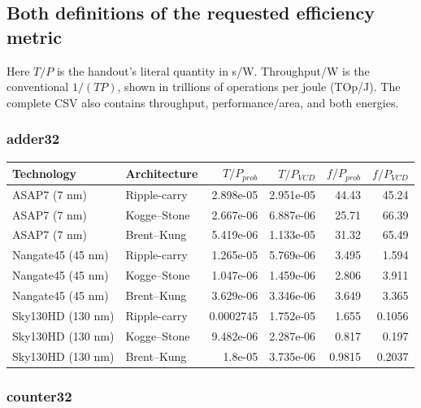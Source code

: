 \documentclass[10pt,letterpaper]{article}
\begin{document}
\subsection{Both definitions of the requested efficiency metric}
Here $T/P$ is the handout's literal quantity in s/W. Throughput/W is the
conventional $1/(TP)$, shown in trillions of operations per joule (TOp/J).
The complete CSV also contains throughput, performance/area, and both energies.


\subsubsection{adder32}

\begin{center}\small
\begin{tabular}{llrrrr}
\toprule
Technology & Architecture & $T/P_{prob}$ & $T/P_{VCD}$ & $f/P_{prob}$ & $f/P_{VCD}$ \\
\midrule
ASAP7 (7 nm) & Ripple-carry & 2.898e-05 & 2.951e-05 & 44.43 & 45.24 \\
ASAP7 (7 nm) & Kogge--Stone & 2.667e-06 & 6.887e-06 & 25.71 & 66.39 \\
ASAP7 (7 nm) & Brent--Kung & 5.419e-06 & 1.133e-05 & 31.32 & 65.49 \\
Nangate45 (45 nm) & Ripple-carry & 1.265e-05 & 5.769e-06 & 3.495 & 1.594 \\
Nangate45 (45 nm) & Kogge--Stone & 1.047e-06 & 1.459e-06 & 2.806 & 3.911 \\
Nangate45 (45 nm) & Brent--Kung & 3.629e-06 & 3.346e-06 & 3.649 & 3.365 \\
Sky130HD (130 nm) & Ripple-carry & 0.0002745 & 1.752e-05 & 1.655 & 0.1056 \\
Sky130HD (130 nm) & Kogge--Stone & 9.482e-06 & 2.287e-06 & 0.817 & 0.197 \\
Sky130HD (130 nm) & Brent--Kung & 1.8e-05 & 3.735e-06 & 0.9815 & 0.2037 \\
\bottomrule
\end{tabular}
\end{center}

\subsubsection{counter32}
\end{document}
